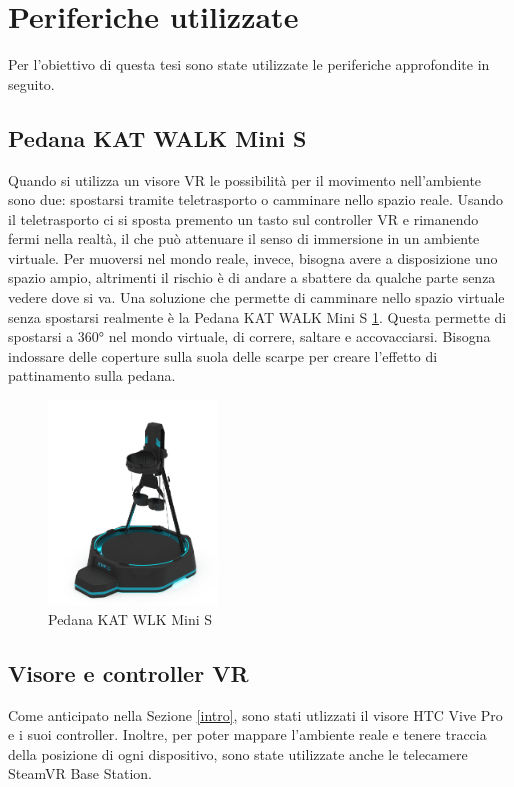 \documentclass[target=bach,aauheader=]{thud}
\begin{document}
\section{Periferiche utilizzate}
Per l'obiettivo di questa tesi sono state utilizzate le periferiche approfondite in seguito.

\subsection{Pedana KAT WALK Mini S}
Quando si utilizza un visore VR le possibilità per il movimento nell'ambiente sono due: spostarsi tramite teletrasporto o camminare nello spazio reale.
Usando il teletrasporto ci si sposta premento un tasto sul controller VR e rimanendo fermi nella realtà, il che può attenuare il senso di immersione in un ambiente virtuale.
Per muoversi nel mondo reale, invece, bisogna avere a disposizione uno spazio ampio, altrimenti il rischio è di andare a sbattere da qualche parte senza vedere dove si va.
Una soluzione che permette di camminare nello spazio virtuale senza spostarsi realmente è la Pedana KAT WALK Mini S \ref{fig:kat_walk}.
Questa permette di spostarsi a 360° nel mondo virtuale, di correre, saltare e accovacciarsi. 
Bisogna indossare delle coperture sulla suola delle scarpe per creare l'effetto di pattinamento sulla pedana.    

\begin{figure}[h]
    \centering
    \includegraphics[width=0.40\textwidth]{kat_walk_mini}
    \caption{Pedana KAT WLK Mini S}
    \label{fig:kat_walk}
\end{figure}

\subsection{Visore e controller VR}
Come anticipato nella Sezione \ref{intro}, sono stati utlizzati il visore HTC Vive Pro e i suoi controller.
Inoltre, per poter mappare l'ambiente reale e tenere traccia della posizione di ogni dispositivo, sono state utilizzate anche le telecamere SteamVR Base Station.
\end{document}
